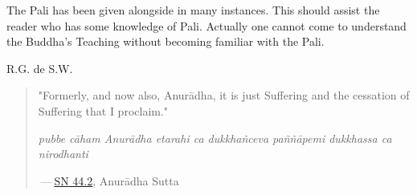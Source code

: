 The Pali has been given alongside in many instances. This should assist
the reader who has some knowledge of Pali. Actually one cannot come to
understand the Buddha’s Teaching without becoming familiar with the
Pali.


R.G. de S.W.



\vfill\eject

\begin{quotation}
"Formerly, and now also, Anurādha, it is just Suffering and the
cessation of Suffering that I proclaim."


\emph{pubbe cāham Anurādha etarahi ca dukkhañceva paññāpemi dukkhassa ca nirodhanti}


 — \href{https://suttacentral.net/sn44.2/en/sujato}{SN 44.2}, Anurādha Sutta


\end{quotation}

